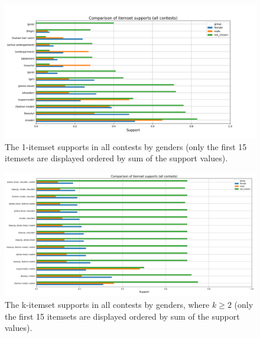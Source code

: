 \documentclass[english]{tktltiki}
\begin{document}
\begin{figure}[h] 
    \begin{center}
        \includegraphics[width=1.25\textwidth,center]{Images/itemset_supports-gender-all_contests-1_itemset.png}
        \caption{The 1-itemset supports in all contests by genders (only the first 15 itemsets are displayed ordered by sum of the support values).}
    \end{center}
\end{figure}

\begin{figure}[h] 
    \begin{center}
        \includegraphics[width=1.25\textwidth,center]{Images/itemset_supports-gender-all_contests-over2_itemset.png}
        \caption{The k-itemset supports in all contests by genders, where $k \geq 2$ (only the first 15 itemsets are displayed ordered by sum of the support values).}
    \end{center}
\end{figure}
\end{document}
